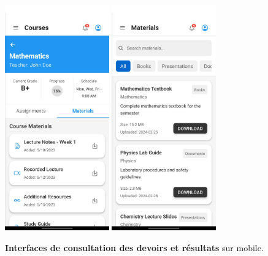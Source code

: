 \begin{figure}[H]
  \centering
  \includegraphics[width=0.4\textwidth,keepaspectratio]{pfe-pics/Mobile /Students/Screenshot_20250610_130150_Expo Go.jpg}
  \includegraphics[width=0.4\textwidth,keepaspectratio]{pfe-pics/Mobile /Students/Screenshot_20250610_130310_Expo Go.jpg}
  \caption{\textbf{Interfaces de consultation des devoirs et résultats} sur mobile.}
  \label{fig:mobile_student_assignments}
\end{figure}


